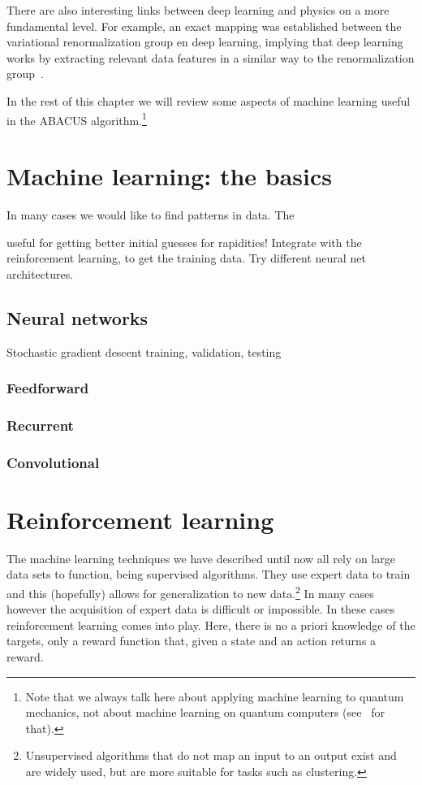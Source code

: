 \documentclass[11pt, a4paper]{report} %
\begin{document}
There are also interesting links between deep learning and physics on a more fundamental level.
For example, an exact mapping was established between the variational renormalization group en deep learning, implying that deep learning works by extracting relevant data features in a similar way to the renormalization group~\cite{Mehta2014}. 

In the rest of this chapter we will review some aspects of machine learning useful in the ABACUS algorithm.\footnote{Note that we always talk here about applying machine learning to quantum mechanics, not about machine learning on quantum computers (see~\cite{Dunjko2017} for that).}


\section{Machine learning: the basics}
In many cases we would like to find patterns in data.
The 

useful for getting better initial guesses for rapidities!
Integrate with the reinforcement learning, to get the training data. Try different neural net architectures.
\subsection{Neural networks}
Stochastic gradient descent
training, validation, testing
\subsubsection{Feedforward}
\subsubsection{Recurrent}
\subsubsection{Convolutional}



\section{Reinforcement learning}

The machine learning techniques we have described until now all rely on large data sets to function, being supervised algorithms.
They use expert data to train and this (hopefully) allows for generalization to new data.\footnote{Unsupervised algorithms that do not map an input to an output exist and are widely used, but are more suitable for tasks such as clustering.}
In many cases however the acquisition of expert data is difficult or impossible.
In these cases reinforcement learning comes into play.
Here, there is no a priori knowledge of the targets, only a reward function that, given a state and an action returns a reward.
\end{document}
